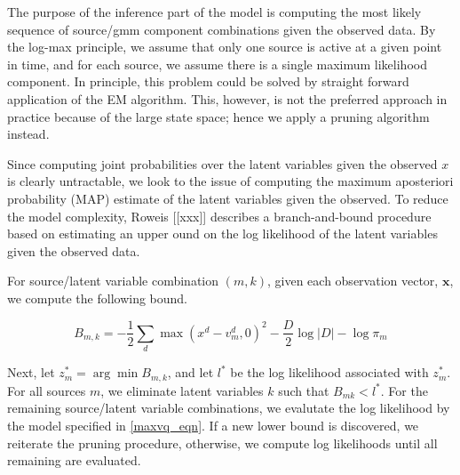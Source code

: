 \documentclass[11pt, oneside, a4paper]{report}
\begin{document}
The purpose of the inference part of the model is computing the most
likely sequence of source/gmm component combinations given the
observed data. By the log-max principle, we assume that only one
source is active at a given point in time, and for each source, we
assume there is a single maximum likelihood component. In principle, this problem could be solved by straight
forward application of the EM algorithm. This, however, is not the
preferred approach in practice because of the large state space; hence
we apply a pruning algorithm instead.

Since computing joint probabilities over the latent variables given the
observed $x$ is clearly  untractable, we look to the issue of
computing the maximum aposteriori probability (MAP) estimate of the
latent variables given the observed. To reduce the model complexity,
Roweis [[xxx]] describes a branch-and-bound procedure based on
estimating an upper ound on the log likelihood of the latent variables
given the observed data.

For source/latent variable combination $(m,k)$, given each observation
vector, $\mathbf{x}$, we compute the following bound.

\begin{equation}\label{bound}
  B_{m,k} = -\frac{1}{2}\sum_d \max(x^d - v_m^d,0)^2 - \frac{D}{2}\log|D|-\log \pi_m
\end{equation}

Next, let $z_m^{*} = \arg \min B_{m,k}$, and let $l^{*}$ be
the log likelihood associated with $z_m^{*}$. For all sources $m$, we
eliminate latent variables $k$ such that $B_{mk}<l^{*}$. For the
remaining source/latent variable combinations, we evalutate the log
likelihood by the model specified in \ref{maxvq_eqn}. If a new lower
bound is discovered, we reiterate the pruning procedure, otherwise, we
compute log likelihoods until all remaining are evaluated.
\end{document}
